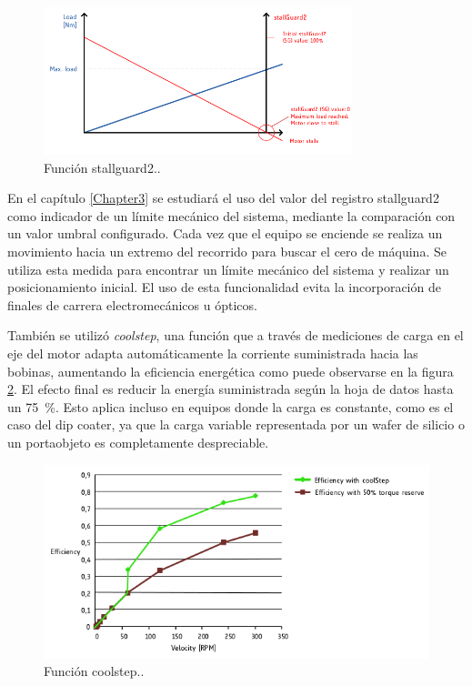 \begin{figure}[h]
\centering 
\includegraphics[width=0.8\textwidth]{./Figures/tmc5130_stallguard2.png}
\caption{Función stallguard2.\protect\footnotemark.}
\label{fig:tmc5130_stallGuard2}
\end{figure}


En el capítulo \ref{Chapter3} se estudiará el uso del valor del registro stallguard2 como indicador de un límite mecánico del sistema, mediante la comparación con un valor umbral configurado. Cada vez que el equipo se enciende se realiza un movimiento hacia un extremo del recorrido para buscar el cero de máquina. Se utiliza esta medida para encontrar un límite mecánico del sistema y realizar  un posicionamiento inicial. El uso de esta funcionalidad evita la incorporación de finales de carrera electromecánicos u ópticos.   


También se utilizó \textit{coolstep}, una función que a través de mediciones de carga en el eje del motor adapta automáticamente la corriente suministrada hacia las bobinas, aumentando la eficiencia energética como puede observarse en la figura \ref{fig:tmc5130_coolStep}. El efecto final es reducir la energía suministrada según la hoja de datos \citep{3_web_trinamic_producto} hasta un \SI{75}{\percent}. Esto aplica incluso en equipos donde la carga es constante, como es el caso del dip coater, ya que la carga variable representada por un wafer de silicio o un portaobjeto es completamente despreciable.

\begin{figure}[h]
\centering 
\includegraphics[width=1\textwidth]{./Figures/tmc5130_coolstep.png}
\caption{Función coolstep.\protect\footnotemark.}
\label{fig:tmc5130_coolStep}
\end{figure}

